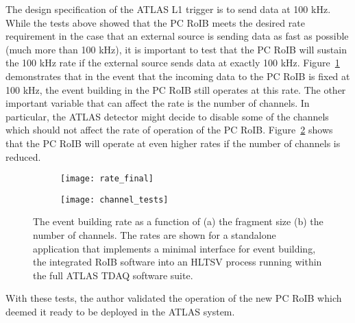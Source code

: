 The design specification of the ATLAS L1 trigger is to send data at 100 kHz.
While the tests above showed that the PC RoIB meets the desired rate 
requirement in the case that an external source is sending data as fast 
as possible (much more than 100 kHz), it is important to test that the 
PC RoIB will sustain the 100 kHz rate if the external source sends data 
at exactly 100 kHz. Figure~\ref{fig:roib.proto.rate_finala} demonstrates 
that in the event that the incoming data to the PC RoIB is fixed at 
100 kHz, the event building in the PC RoIB still operates at this rate.
The other important variable that can affect the rate is the number of 
channels. In particular, the ATLAS detector might decide to disable 
some of the channels which should not affect the rate of operation of the 
PC RoIB. Figure~\ref{fig:roib.perf.chan} shows that the PC RoIB will 
operate at even higher rates if the number of channels is reduced.

\begin{figure}[p!]
  \centering
  \begin{subfigure}{0.48\textwidth}
    \texttt{[image: rate\_final]}
    \subcaption{}
    \label{fig:roib.proto.rate_finala}
  \end{subfigure}
  \begin{subfigure}{0.48\textwidth}
    \texttt{[image: channel\_tests]}
    \subcaption{}
    \label{fig:roib.perf.chan}
  \end{subfigure}
  \caption{The event building rate as a function of (a) the fragment size
(b) the number of channels. The rates are shown for a standalone application that implements 
  a minimal interface for event building, the integrated RoIB software into an HLTSV process running within the full ATLAS TDAQ software suite.}
  \label{fig:roib.perf.other}
\end{figure}

With these tests, the author validated the operation of the new PC RoIB
which deemed it ready to be deployed in the ATLAS system.
